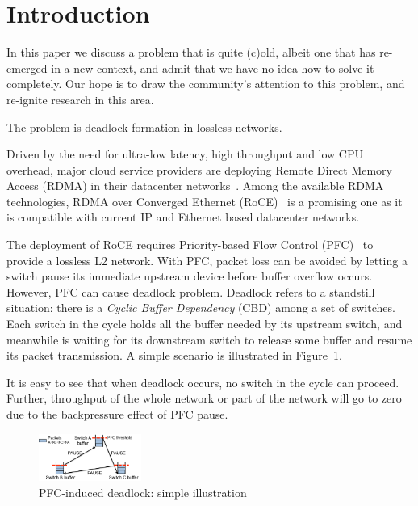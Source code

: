 \secspace
\section{Introduction}
\secspace
\label{sec:intro}

In this paper we discuss a problem that is quite (c)old, albeit one that has
re-emerged in a new context, and admit that we have no idea how to solve it
completely. Our hope is to draw the community's attention to this problem, and
re-ignite research in this area.

The problem is deadlock formation in lossless networks.

Driven by the need for ultra-low latency, high throughput and low CPU overhead,
major cloud service providers are deploying Remote Direct Memory Access (RDMA) in
their datacenter networks~\cite{dcqcn,timely}. Among the
available RDMA technologies,  RDMA over Converged Ethernet (RoCE)~\cite{roce} is
a promising one as it is compatible with current IP and Ethernet based
datacenter networks.

The deployment of RoCE requires Priority-based Flow Control (PFC)~\cite{pfc} to
provide a lossless L2 network. With PFC, packet loss can be avoided by letting a
switch pause its immediate upstream device before buffer overflow occurs.
However, PFC can cause deadlock problem. Deadlock refers to a
standstill situation: there is a {\em Cyclic Buffer Dependency} (CBD) among a set of
switches. Each switch in the cycle holds all the buffer needed by its upstream
switch, and meanwhile is waiting for its downstream switch to release some
buffer and resume its packet transmission. A simple scenario is illustrated in
Figure~\ref{fig:deadlock_example}.

It is easy to see that when deadlock occurs, no switch in the cycle can proceed. Further, throughput of the whole network
or part of the network will go to zero due to the backpressure
effect of PFC pause.

\begin{figure}
	\centering
	\includegraphics[width=0.3\textwidth] {figs/deadlock}
	\vspace{-0.15in}
	\caption{PFC-induced deadlock: simple illustration}
	\vspace{-0.25in}
	\label{fig:deadlock_example}
\end{figure}

